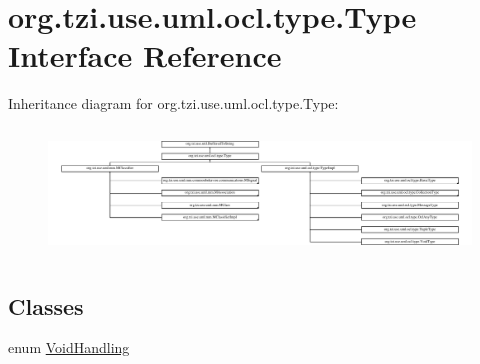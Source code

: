\hypertarget{interfaceorg_1_1tzi_1_1use_1_1uml_1_1ocl_1_1type_1_1_type}{\section{org.\-tzi.\-use.\-uml.\-ocl.\-type.\-Type Interface Reference}
\label{interfaceorg_1_1tzi_1_1use_1_1uml_1_1ocl_1_1type_1_1_type}
}
Inheritance diagram for org.\-tzi.\-use.\-uml.\-ocl.\-type.\-Type\-:\begin{figure}[H]
\begin{center}
\leavevmode
\includegraphics[height=3.433243cm]{interfaceorg_1_1tzi_1_1use_1_1uml_1_1ocl_1_1type_1_1_type}
\end{center}
\end{figure}
\subsection*{Classes}
\begin{DoxyCompactItemize}
\item 
enum \hyperlink{enumorg_1_1tzi_1_1use_1_1uml_1_1ocl_1_1type_1_1_type_1_1_void_handling}{Void\-Handling}
\end{DoxyCompactItemize}
